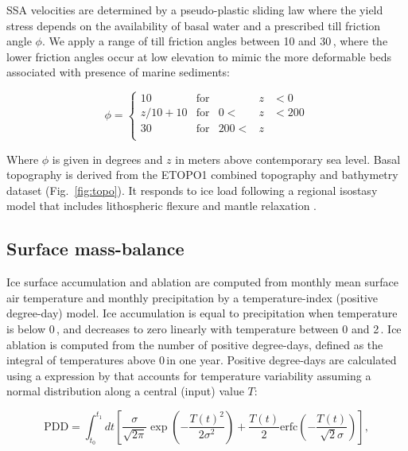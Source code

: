 SSA velocities are determined by a pseudo-plastic sliding law where the yield stress depends on the availability of basal water and a prescribed till friction angle $\phi$. We apply a range of till friction angles between 10 and 30\,\degree, where the lower friction angles occur at low elevation to mimic the more deformable beds associated with presence of marine sediments:

\begin{equation}
	\phi = \left\{\begin{array}{llrll}
		10      & \mathrm{for} &      &z&<  0 \\
		z/10+10 & \mathrm{for} &   0 <&z&<200 \\
		30      & \mathrm{for} & 200 <&z&     \\
	\end{array}\right.
\end{equation}

Where $\phi$ is given in degrees and $z$ in meters above contemporary sea level. Basal topography is derived from the ETOPO1\citep{data:etopo1} combined topography and bathymetry dataset (Fig.~\ref{fig:topo}). It responds to ice load following a regional isostasy model that includes lithospheric flexure and mantle relaxation \citep{lingle-clark-1985}.

\subsection{Surface mass-balance}

Ice surface accumulation and ablation are computed from monthly mean surface air temperature and monthly precipitation by a temperature-index (positive degree-day) model\citep{hock-2003}. Ice accumulation is equal to precipitation when temperature is below 0\,\degC, and decreases to zero linearly with temperature between 0 and 2\,\degC. Ice ablation is computed from the number of positive degree-days, defined as the integral of temperatures above 0\,\degC in one year. Positive degree-days are calculated using a expression by \citet{calov-greve-2005} that accounts for temperature variability assuming a normal distribution along a central (input) value $T$:

\begin{equation}
	\mathrm{PDD} = \int_{t_0}^{t_1} dt \left[
		\frac{\sigma}{\sqrt{2\pi}}
		\exp\left({-\frac{T(t)^2}{2\sigma^2}}\right)
		+\frac{T(t)}{2}
		\mathrm{erfc} \left(-\frac{T(t)}{\sqrt{2}\sigma}\right)
	\right],
\end{equation}

